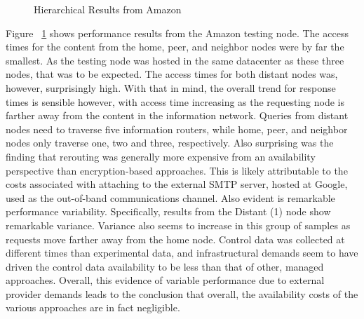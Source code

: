 
\begin{figure}[htbp]
\begin{minipage}[b]{0.5\linewidth}
\centering
{}
\end{minipage}
\begin{minipage}[b]{0.5\linewidth}
\centering
{}
\end{minipage}
\caption{Hierarchical Results from Amazon}
\label{fig:model:amazon-results}
\end{figure}

Figure ~\ref{fig:model:amazon-results} shows performance results from the Amazon testing node.  The access times for the content from the home, peer, and neighbor nodes were by far the smallest.  As the testing node was hosted in the same datacenter as these three nodes, that was to be expected.  The access times for both distant nodes was, however, surprisingly high.  With that in mind, the overall trend for response times is sensible however, with access time increasing as the requesting node is farther away from the content in the information network.  Queries from distant nodes need to traverse five information routers, while home, peer, and neighbor nodes only traverse one, two and three, respectively.  Also surprising was the finding that rerouting was generally more expensive from an availability perspective than encryption-based approaches.  This is likely attributable to the costs associated with attaching to the external SMTP server, hosted at Google, used as the out-of-band communications channel.  Also evident is remarkable performance variability.  Specifically, results from the Distant (1) node show remarkable variance.  Variance also seems to increase in this group of samples as requests move farther away from the home node.  Control data was collected at different times than experimental data, and infrastructural demands seem to have driven the control data availability to be less than that of other, managed approaches.  Overall, this evidence of variable performance due to external provider demands leads to the conclusion that overall, the availability costs of the various approaches are in fact negligible.

